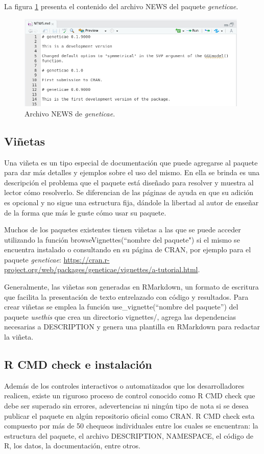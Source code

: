 La figura \ref{fig:fig39} presenta el contenido del archivo NEWS del paquete \emph{geneticae}.

\begin{figure}[h]
	\begin{center}
		\includegraphics[width=11cm]{./Graficos/News.png}	
	\end{center}
	\caption{Archivo NEWS de \emph{geneticae}.}
	\label{fig:fig39}
\end{figure}


\subsection{Viñetas}

Una viñeta es un tipo especial de documentación que puede agregarse al paquete para dar más detalles y ejemplos sobre el uso del mismo. En ella se brinda es una descripción el problema que el paquete está diseñado para resolver y muestra al lector cómo resolverlo. Se diferencian de las páginas de ayuda en que su adición es opcional y no sigue una estructura fija, dándole la libertad al autor de enseñar de la forma que más le guste cómo usar su paquete. 


Muchos de los paquetes existentes tienen viñetas a las que se puede acceder utilizando la función \textcolor{fandango}{browseVignettes(``nombre del paquete")} si el mismo se encuentra instalado o consultando en su página de CRAN, por ejemplo para el paquete \emph{geneticae}: \url{https://cran.r-project.org/web/packages/geneticae/vignettes/a-tutorial.html}.

Generalmente, las viñetas son generadas en RMarkdown, un formato de escritura que facilita la presentación de texto entrelazado con código y resultados. Para crear viñetas se emplea la función \textcolor{fandango}{use\_vignette(``nombre del paquete'')} del paquete \emph{usethis} que crea un directorio vignettes/, agrega las dependencias necesarias a DESCRIPTION y genera una plantilla en RMarkdown para redactar la viñeta. 


\subsection{R CMD check e instalación}
Además de los controles interactivos o automatizados que los desarrolladores realicen, existe un riguroso proceso de control conocido como R CMD check que debe ser superado sin errores, adevertencias ni ningún tipo de nota si se desea publicar el paquete en algún repositorio oficial como CRAN. R CMD check esta compuesto por más de 50 chequeos individuales entre los cuales se encuentran: la estructura del paquete, el archivo DESCRIPTION, NAMESPACE, el código de R, los datos, la documentación, entre otros.  

